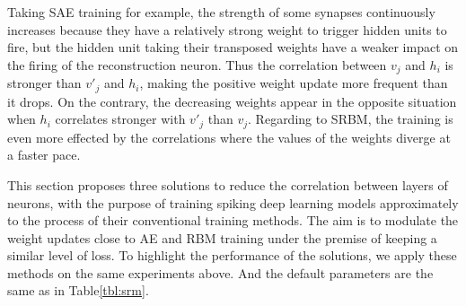 Taking SAE training for example, the strength of some synapses continuously increases because they have a relatively strong weight to trigger hidden units to fire, but the hidden unit taking their transposed weights have a weaker impact on the firing of the reconstruction neuron.
Thus the correlation between $v_j$ and $h_i$ is stronger than $v'_j$ and $h_i$, making the positive weight update more frequent than it drops.
On the contrary, the decreasing weights appear in the opposite situation when $h_i$ correlates stronger with $v'_j$ than $v_j$.
Regarding to SRBM, the training is even more effected by the correlations where the values of the weights diverge at a faster pace.
 
 
This section proposes three solutions to reduce the correlation between layers of neurons, with the purpose of training spiking deep learning models approximately to the process of their conventional training methods.
The aim is to modulate the weight updates close to AE and RBM training under the premise of keeping a similar level of loss.
To highlight the performance of the solutions, we apply these methods on the same experiments above.
And the default parameters are the same as in Table\ref{tbl:srm}.
